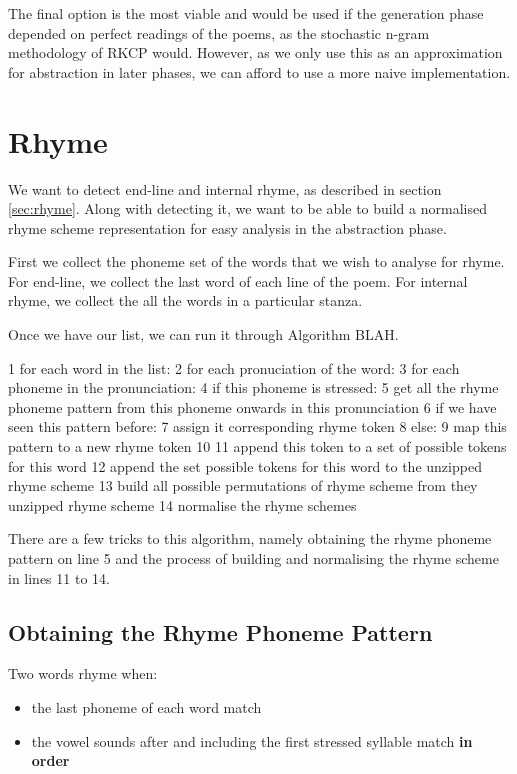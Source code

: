 The final option is the most viable and would be used if the generation phase depended on perfect readings of the poems, as the stochastic n-gram methodology of RKCP would. However, as we only use this as an approximation for abstraction in later phases, we can afford to use a more naive implementation.


\section{Rhyme}

We want to detect end-line and internal rhyme, as described in section \ref{sec:rhyme}. Along with detecting it, we want to be able to build a normalised rhyme scheme representation for easy analysis in the abstraction phase. 

First we collect the phoneme set of the words that we wish to analyse for rhyme. For end-line, we collect the last word of each line of the poem. For internal rhyme, we collect the all the words in a particular stanza.

Once we have our list, we can run it through Algorithm BLAH.

1 for each word in the list:
2 	for each pronuciation of the word:
3		for each phoneme in the pronunciation:
4			if this phoneme is stressed:
5				get all the rhyme phoneme pattern from this phoneme onwards in this pronunciation
6				if we have seen this pattern before: 
7					assign it corresponding rhyme token
8				else:
9					map this pattern to a new rhyme token
10				
11				append this token to a set of possible tokens for this word				
12	append the set possible tokens for this word to the unzipped rhyme scheme
13 build all possible permutations of rhyme scheme from they unzipped rhyme scheme
14 normalise the rhyme schemes
	
There are a few tricks to this algorithm, namely obtaining the rhyme phoneme pattern on line 5 and the process of building and normalising the rhyme scheme in lines 11 to 14.

\subsection{Obtaining the Rhyme Phoneme Pattern}

Two words rhyme when:
\begin{itemize}
\item{the last phoneme of each word match}
\item{the vowel sounds after and including the first stressed syllable match \textbf{in order}}
\end{itemize}

